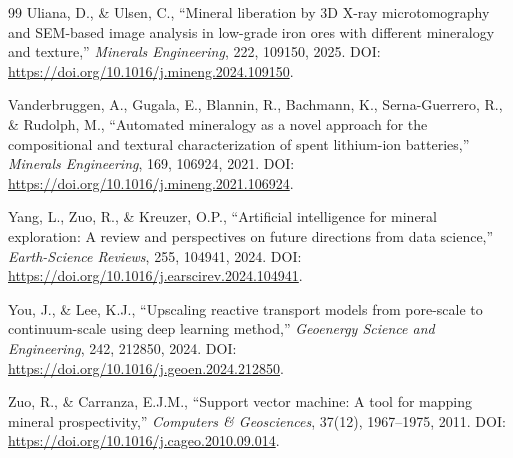 \documentclass[12pt,a4paper]{article}
\begin{document}
\begin{thebibliography}{99}
Uliana, D., \& Ulsen, C., ``Mineral liberation by 3D X-ray microtomography and SEM-based image analysis in low-grade iron ores with different mineralogy and texture,'' \textit{Minerals Engineering}, 222, 109150, 2025. DOI: \url{https://doi.org/10.1016/j.mineng.2024.109150}.

Vanderbruggen, A., Gugala, E., Blannin, R., Bachmann, K., Serna-Guerrero, R., \& Rudolph, M., ``Automated mineralogy as a novel approach for the compositional and textural characterization of spent lithium-ion batteries,'' \textit{Minerals Engineering}, 169, 106924, 2021. DOI: \url{https://doi.org/10.1016/j.mineng.2021.106924}.

Yang, L., Zuo, R., \& Kreuzer, O.P., ``Artificial intelligence for mineral exploration: A review and perspectives on future directions from data science,'' \textit{Earth-Science Reviews}, 255, 104941, 2024. DOI: \url{https://doi.org/10.1016/j.earscirev.2024.104941}.

You, J., \& Lee, K.J., ``Upscaling reactive transport models from pore-scale to continuum-scale using deep learning method,'' \textit{Geoenergy Science and Engineering}, 242, 212850, 2024. DOI: \url{https://doi.org/10.1016/j.geoen.2024.212850}.

Zuo, R., \& Carranza, E.J.M., ``Support vector machine: A tool for mapping mineral prospectivity,'' \textit{Computers \& Geosciences}, 37(12), 1967--1975, 2011. DOI: \url{https://doi.org/10.1016/j.cageo.2010.09.014}.

\end{thebibliography}
\end{document}
